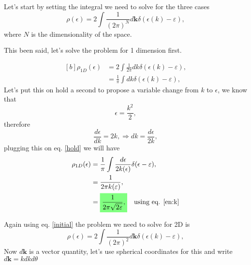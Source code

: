 \begin{questions}
\begin{solution}
  Let's start by setting the integral we need to solve for the three cases
  \begin{equation}
    \rho(\epsilon) = 2\int \frac{1}{(2\pi)^N}d\bm{k} \delta(\epsilon(k) - \varepsilon),
    \label{initial}
  \end{equation}
  where $N$ is the dimensionality of the space.

  This been said, let's solve the problem for 1 dimension first.

  \begin{equation}
    \begin{aligned}[b]
      \rho_{1D}(\epsilon) &= 2\int \frac{1}{2\pi}dk \delta(\epsilon(k) - \varepsilon),\\
      &= \frac{1}{\pi} \int dk \delta(\epsilon(k) - \varepsilon),
    \end{aligned}
    \label{hold}
  \end{equation}
  Let's put this on hold a second to propose a variable change from $k$ to $\epsilon$, we know that
  \begin{equation}
    \epsilon = \frac{k^2}{2},
    \label{en:k}
  \end{equation}
   therefore
  \begin{equation}
    \frac{d\epsilon}{dk} = 2k,  \Rightarrow dk = \frac{d\epsilon}{2k},
    \label{var:change}
  \end{equation}
plugging this on eq. \ref{hold} we will have
\begin{equation}
  \begin{aligned}[b]
    \rho_{1D}(\epsilon) &= \frac{1}{\pi} \int \frac{d\epsilon}{2k(\epsilon)}\delta(\epsilon - \varepsilon),\\
    &= \frac{1}{2\pi k(\varepsilon)},\\
    &= \hlgreen{\frac{1}{2\pi \sqrt{2\varepsilon}},} \quad \text{using eq. \ref{en:k}}
  \end{aligned}
\end{equation}
\end{solution}
\begin{solution}
Again using eq. \ref{initial} the problem we need to solve for 2D is
\begin{equation}
  \rho(\epsilon) = 2\int \frac{1}{(2\pi)^2}d\bm{k} \delta(\epsilon(k) - \varepsilon),
\end{equation}
Now $d\bm{k}$ is a vector quantity, let's use spherical coordinates for this and write $d\bm{k} = kdkd\theta$

\end{solution}
\end{questions}
